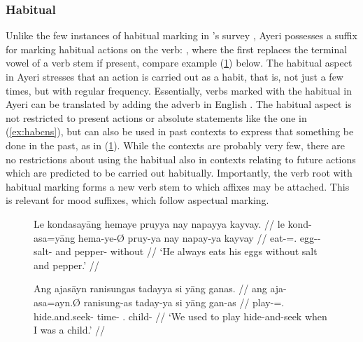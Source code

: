 
\subsubsection{Habitual}

Unlike the few instances of habitual marking in \citet{dahl1985}'s survey
\citep[96]{dahl1985}, Ayeri possesses a suffix for marking habitual actions on
the verb: , where the first  replaces the terminal vowel
of a verb stem if present, compare example (\ref{ex:habvwl}) below. The
habitual aspect in Ayeri stresses that an action is carried out as a habit,
that is, not just a few times, but with regular frequency. Essentially, verbs
marked with the habitual in Ayeri can be translated by adding the adverb
 in English \citep[97]{dahl1985}. The habitual aspect is not
restricted to present actions or absolute statements like the one in
(\ref{ex:habcns}), but can also be used in past contexts to express that
something  be done in the past, as in (\ref{ex:habvwl}). While the
contexts are probably very few, there are no restrictions about using the
habitual also in contexts relating to future actions which are predicted to be
carried out habitually. Importantly, the verb root with habitual marking forms
a new verb stem to which affixes may be attached. This is relevant for mood
suffixes, which follow aspectual marking.

\begin{figure}[h]
\pex
\a\label{ex:habcns}\begingl
	\gla Le kondasayāng hemaye pruyya nay napayya kayvay. //
	\glb le kond-asa=yāng hema-ye-Ø pruy-ya nay napay-ya kayvay //
	\glc \PatTI{} eat-\Hab{}=\TsgM{}.\Aarg{} egg-\Pl{}-\Top{} salt-\Loc{} 
		and pepper-\Loc{} without //
	\glft `He always eats his eggs without salt and pepper.' //
\endgl

\a\label{ex:habvwl}\begingl
	\gla Ang ajasāyn ranisungas tadayya si yāng ganas. //
	\glb ang aja-asa=ayn.Ø ranisung-as taday-ya si yāng gan-as //
	\glc \AgtT{} play-\Hab{}=\Fpl{}.\Top{} hide.and.seek-\Parg{} 
		time-\Loc{} \Rel{} \Fsg{}.\Aarg{} child-\Parg{} //
	\glft `We used to play hide-and-seek when I was a child.' //
\endgl
\xe
\end{figure}


